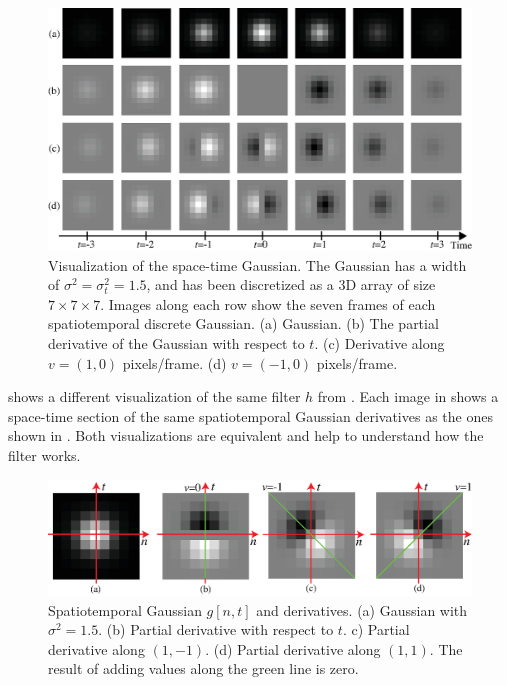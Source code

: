 \begin{figure}
\includegraphics[width=1\linewidth]{figures/temporal_filters/gaussians_xyt_seq.eps}
\caption{Visualization of the space-time Gaussian. The Gaussian has a width of $\sigma^2=\sigma_t^2=1.5$, and has been discretized as a 3D array of size $7 \times 7 \times 7$. Images along each row show the seven frames of each spatiotemporal discrete Gaussian. (a)  Gaussian. (b) The partial derivative of the Gaussian with respect to $t$. (c) Derivative along $v=(1,0)$ pixels/frame. (d) $v=(-1,0)$ pixels/frame.} 
\label{fig:gaussian_seq}
\end{figure}

\Fig{\ref{fig:gaussian_xyt_section}} shows a different visualization of the same filter $h$ from \eqn{\ref{eq:spt_nulling_filter}}. Each image in \fig{\ref{fig:gaussian_xyt_section}}
shows a space-time section of the same spatiotemporal Gaussian derivatives as the ones shown in \fig{\ref{fig:gaussian_seq}}. Both visualizations are equivalent and help to understand how the filter works.


\begin{figure}
\includegraphics[width=1\linewidth]{figures/temporal_filters/gaussians_xyt_section.eps}
\caption{Spatiotemporal Gaussian $g\left[ n,t \right]$ and derivatives. (a) Gaussian with $\sigma^2=1.5$. (b) Partial derivative with respect to $t$. c) Partial derivative along $(1,-1)$. (d) Partial derivative along $(1,1)$. The result of adding values along the green line is zero.} 
\label{fig:gaussian_xyt_section}
\end{figure}

